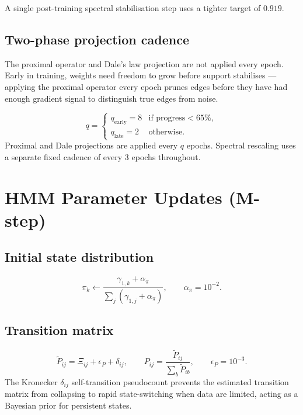 \documentclass[11pt]{article}
\begin{document}
A single post-training spectral stabilisation step uses a tighter target of $0.919$.

\subsection{Two-phase projection cadence}

The proximal operator and Dale's law projection are not applied every epoch.
Early in training, weights need freedom to grow before support stabilises --- applying
the proximal operator every epoch prunes edges before they have had enough gradient
signal to distinguish true edges from noise.

\begin{equation}
  q = \begin{cases} q_{\mathrm{early}} = 8 & \text{if progress} < 65\%,\\
                    q_{\mathrm{late}} = 2  & \text{otherwise.} \end{cases}
\end{equation}
Proximal and Dale projections are applied every $q$ epochs.
Spectral rescaling uses a separate fixed cadence of every 3 epochs throughout.

\section{HMM Parameter Updates (M-step)}

\subsection{Initial state distribution}
\begin{equation}
  \pi_k \leftarrow \frac{\gamma_{1,k}+\alpha_\pi}{\sum_j(\gamma_{1,j}+\alpha_\pi)},
  \qquad \alpha_\pi=10^{-2}.
\end{equation}

\subsection{Transition matrix}
\begin{equation}
  \tilde P_{ij} = \Xi_{ij}+\epsilon_P+\delta_{ij},
  \qquad
  P_{ij} = \frac{\tilde P_{ij}}{\sum_b\tilde P_{ib}},
  \qquad \epsilon_P=10^{-3}.
\end{equation}
The Kronecker $\delta_{ij}$ self-transition pseudocount prevents the estimated
transition matrix from collapsing to rapid state-switching when data are limited,
acting as a Bayesian prior for persistent states.
\end{document}
